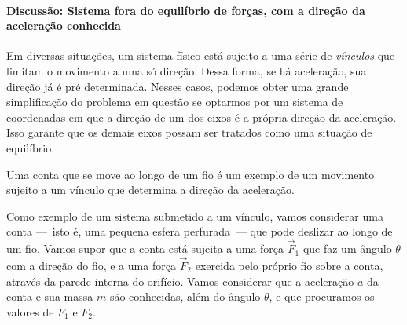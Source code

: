 

\paragraph{Discussão: Sistema fora do equilíbrio de forças, com a direção da aceleração conhecida}

Em diversas situações, um sistema físico está sujeito a uma série de \emph{vínculos} que limitam o movimento a uma só direção. Dessa forma, se há aceleração, sua direção já é pré determinada. Nesses casos, podemos obter uma grande simplificação do problema em questão se optarmos por um sistema de coordenadas em que a direção de um dos eixos é a própria direção da aceleração. Isso garante que os demais eixos possam ser tratados como uma situação de equilíbrio.

\begin{marginfigure}
\centering
{}
\caption{Uma conta que se move ao longo de um fio é um exemplo de um movimento sujeito a um vínculo que determina a direção da aceleração.\label{Fig:ContaDeslisandoEmFio}}
\end{marginfigure}

Como exemplo de um sistema submetido a um vínculo, vamos considerar uma conta ---~isto é, uma pequena esfera perfurada~--- que pode deslizar ao longo de um fio. Vamos supor que a conta está sujeita a uma força $\vec{F}_1$ que faz um ângulo $\theta$ com a direção do fio, e a uma força $\vec{F}_2$ exercida pelo próprio fio sobre a conta, através da parede interna do orifício. Vamos considerar que a aceleração $a$ da conta e sua massa $m$ são conhecidas, além do ângulo $\theta$, e que procuramos os valores de $F_1$ e $F_2$.

